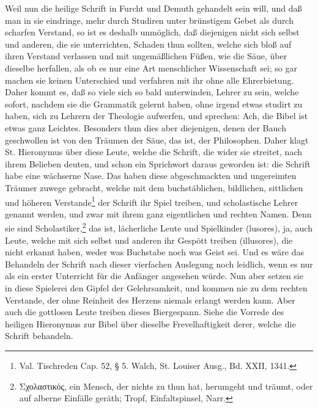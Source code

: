 Weil nun die heilige Schrift in Furcht und Demuth gehandelt sein will, und daß man in sie eindringe, mehr durch Studiren unter brünstigem Gebet als durch scharfen Verstand, so ist es deshalb unmöglich, daß diejenigen nicht sich selbst und anderen, die sie unterrichten, Schaden thun sollten, welche sich bloß auf ihren Verstand verlassen und mit ungemäßlichen Füßen, wie die Säue, über dieselbe herfallen, als ob es nur eine Art menschlicher Wissenschaft sei; so gar machen sie keinen Unterschied und verfahren mit ihr ohne alle Ehrerbietung. Daher kommt es, daß so viele sich so bald unterwinden, Lehrer zu sein, welche sofort, nachdem sie die Grammatik gelernt haben, ohne irgend etwas studirt zu haben, sich zu Lehrern der Theologie aufwerfen, und sprechen: Ach, die Bibel ist etwas ganz Leichtes. Besonders thun dies aber diejenigen, denen der Bauch geschwollen ist von den Träumen der Säue, das ist, der Philosophen. Daher klagt St. Hieronymus über diese Leute, welche die Schrift, die wider sie streitet, nach ihrem Belieben deuten, und schon ein Sprichwort daraus geworden ist: die Schrift habe eine wächserne Nase. Das haben diese abgeschmackten und ungereimten Träumer zuwege gebracht, welche mit dem buchstäblichen, bildlichen, sittlichen und höheren Verstande\footnote{Val. Tischreden Cap. 52, § 5. Walch, St. Louiser Ausg., Bd. XXII, 1341.} der Schrift ihr Spiel treiben, und scholastische Lehrer genannt werden, und zwar mit ihrem ganz eigentlichen und rechten Namen. Denn sie sind Scholastiker,\footnote{Σχολαστικός, ein Mensch, der nichts zu thun hat, herumgeht und träumt, oder auf alberne Einfälle geräth; Tropf, Einfaltspinsel, Narr.} das ist, lächerliche Leute und Spielkinder (lusores), ja, auch Leute, welche mit sich selbst und anderen ihr Gespött treiben (illusores), die nicht erkannt haben, weder was Buchstabe noch was Geist sei. Und es wäre das Behandeln der Schrift nach dieser vierfachen Auslegung noch leidlich, wenn es nur als ein erster Unterricht für die Anfänger angesehen würde. Nun aber setzen sie in diese Spielerei den Gipfel der Gelehrsamkeit, und kommen nie zu dem rechten Verstande, der ohne Reinheit des Herzens niemals erlangt werden kann. Aber auch die gottlosen Leute treiben dieses Biergespann. Siehe die Vorrede des heiligen Hieronymus zur Bibel über dieselbe Frevelhaftigkeit derer, welche die Schrift behandeln.

